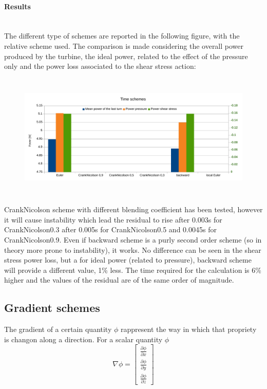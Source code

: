 \documentclass[a4paper,12pt]{article}
\begin{document}
\paragraph{Results} \mbox{}\\
The different type of schemes are reported in the following figure, with the relative scheme used. The comparison is made considering the overall power produced by the turbine, the ideal power, related to the effect of the pressure only and the power loss associated to the shear stress action:
\begin{figure}[H]
\centering
\includegraphics[height=6cm]{images/schemes/timeschems-results.pdf}
\end{figure}

CrankNicolson scheme with different blending coefficient has been tested, however it will cause instability which lead the residual to rise after 0.003s for CrankNicolson0.3 after 0.005s for CrankNicolson0.5 and 0.0045s for CrankNicolson0.9.
Even if backward scheme is a purly second order scheme (so in theory more prone to instability), it works.
No difference can be seen in the shear stress power loss, but a for ideal power (related to pressure), backward scheme will provide a different value, 1\% less. The time required for the calculation is 6\% higher and the values of the residual are of the same order of magnitude.



\subsection{Gradient schemes}
The gradient of a certain quantity $\phi$ rappresent the way in which that propriety is changon along a direction. For a scalar quantity $\phi$
\\ 
\begin{equation}
\nabla \phi = \begin{bmatrix} \frac{\partial \phi}{\partial x} \\ \frac{\partial \phi}{\partial y} \\\frac{\partial \phi}{\partial z}\end{bmatrix} 
\end{equation}
\end{document}
